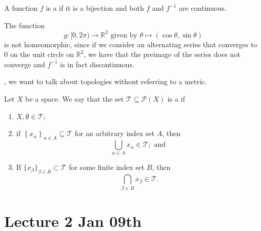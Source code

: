 \documentclass[notoc,notitlepage]{tufte-book}
\begin{document}
\begin{defn}[Homeomorphism]\label{defn:homeomorphism}
  A function $f$ is a  if it is a bijection and both $f$ and $f^{-1}$ are continuous.
\end{defn}

\begin{eg}
  The function
  \begin{equation*}
    g : [ 0, 2\pi ) \to \mathbb{R}^2 \text{ given by } \theta \mapsto (\cos \theta, \sin \theta)
  \end{equation*}
  is not homeomorphic, since if we consider an alternating series that converges to $0$ on the unit circle on $\mathbb{R}^2$, we have that the preimage of the series does not converge and $f^{-1}$ is in fact discontinuous.
\end{eg}


, we want to talk about topologies without referring to a metric.

\begin{defn}[Topology]\label{defn:topology}
  Let $X$ be a space. We say that the set $\mathcal{T} \subseteq \mathcal{P}(X)$ is a  if
  \begin{enumerate}
    \item $X, \emptyset \in \mathcal{T}$;
    \item if $\left\{ x_\alpha \right\}_{\alpha \in A} \subseteq \mathcal{T}$ for an arbitrary index set $A$, then
      \begin{equation*}
        \bigcup_{\alpha \in A} x_\alpha \in \mathcal{T}; \text{ and }
      \end{equation*}
    \item If $\{ x_\beta \}_{\beta \in B} \subset \mathcal{T}$ for some finite index set $B$, then
      \begin{equation*}
        \bigcap_{\beta \in B} x_\beta \in \mathcal{T}.
      \end{equation*}
  \end{enumerate}
\end{defn}



\chapter{Lecture 2 Jan 09th}%
\label{chp:lecture_2_jan_09th}
\end{document}
